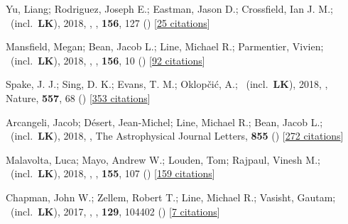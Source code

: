 \item[{\color{numcolor}\scriptsize21}] Yu, Liang; Rodriguez, Joseph E.; Eastman, Jason D.; Crossfield, Ian J. M.; \etal\ (incl.\ \textbf{LK}), 2018, , \aj, \textbf{156}, 127 () [\href{https://ui.adsabs.harvard.edu/abs/2018AJ....156..127Y}{25 citations}]

\item[{\color{numcolor}\scriptsize20}] Mansfield, Megan; Bean, Jacob L.; Line, Michael R.; Parmentier, Vivien; \etal\ (incl.\ \textbf{LK}), 2018, , \aj, \textbf{156}, 10 () [\href{https://ui.adsabs.harvard.edu/abs/2018AJ....156...10M}{92 citations}]

\item[{\color{numcolor}\scriptsize19}] Spake, J. J.; Sing, D. K.; Evans, T. M.; Oklop{\v{c}}i{\'c}, A.; \etal\ (incl.\ \textbf{LK}), 2018, , Nature, \textbf{557}, 68 () [\href{https://ui.adsabs.harvard.edu/abs/2018Natur.557...68S}{353 citations}]

\item[{\color{numcolor}\scriptsize18}] Arcangeli, Jacob; D{\'e}sert, Jean-Michel; Line, Michael R.; Bean, Jacob L.; \etal\ (incl.\ \textbf{LK}), 2018, , The Astrophysical Journal Letters, \textbf{855} () [\href{https://ui.adsabs.harvard.edu/abs/2018ApJ...855L..30A}{272 citations}]

\item[{\color{numcolor}\scriptsize17}] Malavolta, Luca; Mayo, Andrew W.; Louden, Tom; Rajpaul, Vinesh M.; \etal\ (incl.\ \textbf{LK}), 2018, , \aj, \textbf{155}, 107 () [\href{https://ui.adsabs.harvard.edu/abs/2018AJ....155..107M}{159 citations}]

\item[{\color{numcolor}\scriptsize16}] Chapman, John W.; Zellem, Robert T.; Line, Michael R.; Vasisht, Gautam; \etal\ (incl.\ \textbf{LK}), 2017, , \pasp, \textbf{129}, 104402 () [\href{https://ui.adsabs.harvard.edu/abs/2017PASP..129j4402C}{7 citations}]


